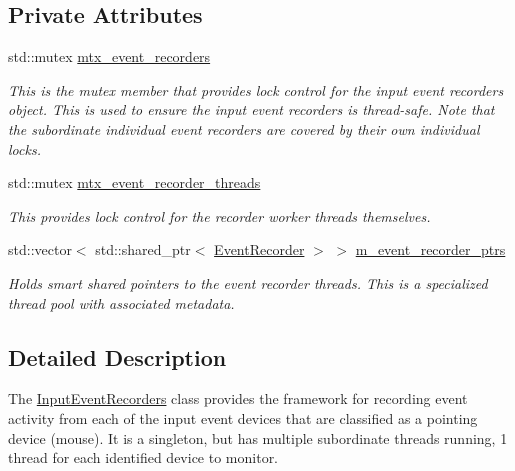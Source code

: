 \subsection*{Private Attributes}
\begin{DoxyCompactItemize}
\item 
\mbox{\label{classEventDetect_1_1InputEventRecorders_a90f6382a599209d35038e37afc904a2a}} 
std\+::mutex \mbox{\hyperlink{classEventDetect_1_1InputEventRecorders_a90f6382a599209d35038e37afc904a2a}{mtx\+\_\+event\+\_\+recorders}}
\begin{DoxyCompactList}\small\item\em This is the mutex member that provides lock control for the input event recorders object. This is used to ensure the input event recorders is thread-\/safe. Note that the subordinate individual event recorders are covered by their own individual locks. \end{DoxyCompactList}\item 
\mbox{\label{classEventDetect_1_1InputEventRecorders_a1f54a876d4ac20791fbd770ab8fd82ba}} 
std\+::mutex \mbox{\hyperlink{classEventDetect_1_1InputEventRecorders_a1f54a876d4ac20791fbd770ab8fd82ba}{mtx\+\_\+event\+\_\+recorder\+\_\+threads}}
\begin{DoxyCompactList}\small\item\em This provides lock control for the recorder worker threads themselves. \end{DoxyCompactList}\item 
\mbox{\label{classEventDetect_1_1InputEventRecorders_a493d7a2d0063cc1e4998a2b99cc0e769}} 
std\+::vector$<$ std\+::shared\+\_\+ptr$<$ \mbox{\hyperlink{classEventDetect_1_1InputEventRecorders_1_1EventRecorder}{Event\+Recorder}} $>$ $>$ \mbox{\hyperlink{classEventDetect_1_1InputEventRecorders_a493d7a2d0063cc1e4998a2b99cc0e769}{m\+\_\+event\+\_\+recorder\+\_\+ptrs}}
\begin{DoxyCompactList}\small\item\em Holds smart shared pointers to the event recorder threads. This is a specialized thread pool with associated metadata. \end{DoxyCompactList}\end{DoxyCompactItemize}


\subsection{Detailed Description}
The \mbox{\hyperlink{classEventDetect_1_1InputEventRecorders}{Input\+Event\+Recorders}} class provides the framework for recording event activity from each of the input event devices that are classified as a pointing device (mouse). It is a singleton, but has multiple subordinate threads running, 1 thread for each identified device to monitor. 

